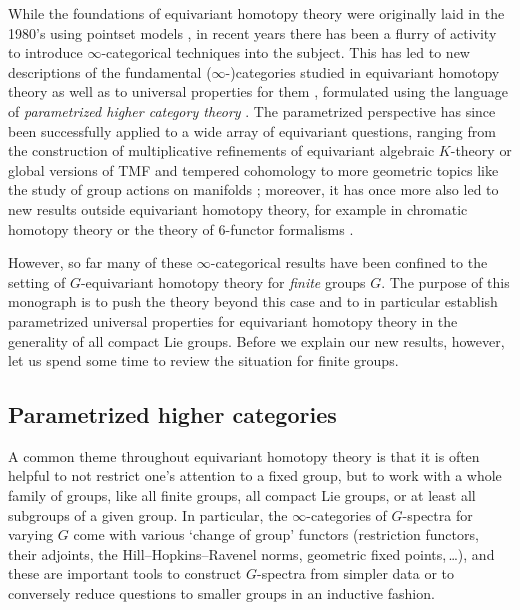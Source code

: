 \documentclass[reqno]{memo-l}
\theoremstyle{mythm}
\theoremstyle{definition}
\numberwithin{equation}{section}
\begin{document}
While the foundations of equivariant homotopy theory were originally laid in the 1980's using pointset models \cite{LMS}, in recent years there has been a flurry of activity to introduce $\infty$-categorical techniques into the subject. This has led to new descriptions of the fundamental ($\infty$-)categories studied in equivariant homotopy theory \cites{barwick2017spectral,cmnn,CLL_Spans,CHLL_NRings,LLP} as well as to universal properties for them \cites{nardin2016exposeIV,shah2021parametrized, CLL_Global,CLL_Clefts}, formulated using the language of \emph{parametrized higher category theory} \cite{exposeI}. The parametrized perspective
has since been successfully applied to a wide array of equivariant questions, ranging from the construction of multiplicative refinements of equivariant algebraic $K$-theory \cites{CHLL_NRings,equiv-motives} or global versions of TMF and tempered cohomology \cites{GLP24,global-ambidextrous} to more geometric topics like the study of group actions on manifolds \cites{hilman2024equivariantpoincaredualitycyclic,hilman2024parametrisedpoincaredualityequivariant,kirstein2025semifreeisovariantpoincarespaces}; moreover, it has once more also led to new results outside equivariant homotopy theory, for example in chromatic homotopy theory \cite{ben-moshe} or the theory of 6-functor formalisms \cite{CLL_Span2}.  

However, so far many of these $\infty$-categorical results have been confined to the setting of $G$-equivariant homotopy theory for \emph{finite} groups $G$. The purpose of this monograph is to push the theory beyond this case and to in particular establish parametrized universal properties for equivariant homotopy theory in the generality of all compact Lie groups. Before we explain our new results, however, let us spend some time to 
review the situation for finite groups.

\subsection*{Parametrized higher categories} 
A common theme throughout equivariant homotopy theory is that it is often helpful to not restrict one's attention to a fixed group, but to work with a whole family of groups, like all finite groups, all compact Lie groups, or at least all subgroups of a given group. In particular, the $\infty$-categories of $G$-spectra for varying $G$ come with various `change of group' functors (restriction functors, their adjoints, the Hill--Hopkins--Ravenel norms, geometric fixed points,\,\dots), and these are important tools to construct $G$-spectra from simpler data or to conversely reduce questions to smaller groups in an inductive fashion.
\end{document}
